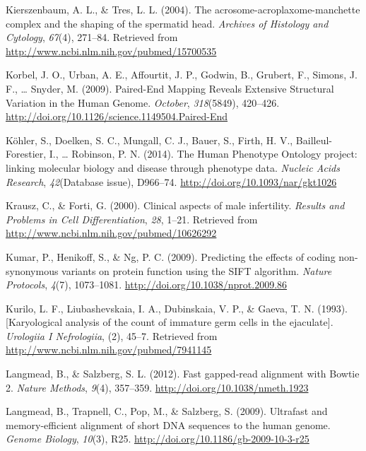 \documentclass[12pt,twoside]{reedthesis}
\theoremstyle{definition}
\theoremstyle{definition}
\theoremstyle{remark}
\begin{document}
  \hypertarget{ref-Kierszenbaum2004}{}
  Kierszenbaum, A. L., \& Tres, L. L. (2004). The
  acrosome-acroplaxome-manchette complex and the shaping of the spermatid
  head. \emph{Archives of Histology and Cytology}, \emph{67}(4), 271--84.
  Retrieved from \url{http://www.ncbi.nlm.nih.gov/pubmed/15700535}
  
  \hypertarget{ref-Korbel2009}{}
  Korbel, J. O., Urban, A. E., Affourtit, J. P., Godwin, B., Grubert, F.,
  Simons, J. F., \ldots{} Snyder, M. (2009). Paired-End Mapping Reveals
  Extensive Structural Variation in the Human Genome. \emph{October},
  \emph{318}(5849), 420--426.
  \url{http://doi.org/10.1126/science.1149504.Paired-End}
  
  \hypertarget{ref-Kohler2014}{}
  Köhler, S., Doelken, S. C., Mungall, C. J., Bauer, S., Firth, H. V.,
  Bailleul-Forestier, I., \ldots{} Robinson, P. N. (2014). The Human
  Phenotype Ontology project: linking molecular biology and disease
  through phenotype data. \emph{Nucleic Acids Research},
  \emph{42}(Database issue), D966--74.
  \url{http://doi.org/10.1093/nar/gkt1026}
  
  \hypertarget{ref-Krausz2000}{}
  Krausz, C., \& Forti, G. (2000). Clinical aspects of male infertility.
  \emph{Results and Problems in Cell Differentiation}, \emph{28}, 1--21.
  Retrieved from \url{http://www.ncbi.nlm.nih.gov/pubmed/10626292}
  
  \hypertarget{ref-Kumar2009}{}
  Kumar, P., Henikoff, S., \& Ng, P. C. (2009). Predicting the effects of
  coding non-synonymous variants on protein function using the SIFT
  algorithm. \emph{Nature Protocols}, \emph{4}(7), 1073--1081.
  \url{http://doi.org/10.1038/nprot.2009.86}
  
  \hypertarget{ref-Kurilo}{}
  Kurilo, L. F., Liubashevskaia, I. A., Dubinskaia, V. P., \& Gaeva, T. N.
  (1993). {[}Karyological analysis of the count of immature germ cells in
  the ejaculate{]}. \emph{Urologiia I Nefrologiia}, (2), 45--7. Retrieved
  from \url{http://www.ncbi.nlm.nih.gov/pubmed/7941145}
  
  \hypertarget{ref-Langmead2012}{}
  Langmead, B., \& Salzberg, S. L. (2012). Fast gapped-read alignment with
  Bowtie 2. \emph{Nature Methods}, \emph{9}(4), 357--359.
  \url{http://doi.org/10.1038/nmeth.1923}
  
  \hypertarget{ref-Langmead2009}{}
  Langmead, B., Trapnell, C., Pop, M., \& Salzberg, S. (2009). Ultrafast
  and memory-efficient alignment of short DNA sequences to the human
  genome. \emph{Genome Biology}, \emph{10}(3), R25.
  \url{http://doi.org/10.1186/gb-2009-10-3-r25}
  
\end{document}
